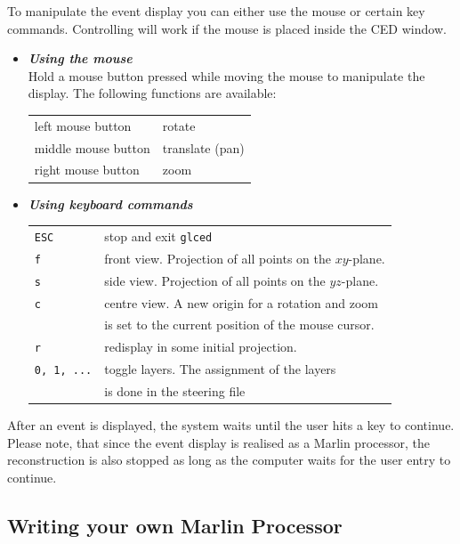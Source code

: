To manipulate the event display you can either use the mouse or 
certain key commands. Controlling will work if the mouse is placed
inside the CED window. 

\begin{itemize}
\item {\em\bf Using the mouse} \\ 
      Hold a mouse button pressed while moving the mouse to 
      manipulate the display. The following functions are available: 

      \begin{center}
      \begin{tabular}{ll}
      left mouse button   & rotate \\
      middle mouse button & translate (pan)\\
      right mouse button  & zoom \\
      \end{tabular}
      \end{center}
\item {\em\bf Using keyboard commands} \\
      \begin{tabular}{ll}
      {\tt ESC} & stop and exit {\tt glced} \\
      {\tt f}   & front view. Projection of all points on the $xy$-plane.\\
      {\tt s}   & side view. Projection of all points on the $yz$-plane. \\
      {\tt c}   & centre view. A new origin for a rotation and zoom \\ 
                & is set to the current position of the mouse cursor.\\
      {\tt r}   & redisplay in some initial projection. \\
      {\tt 0, 1, ...} & toggle layers. The assignment of the layers \\
                      & is done in the steering file \\
      \end{tabular}
\end{itemize}

After an event is displayed, the system waits until the user hits a key
to continue. Please note, that since the event display is realised as a
Marlin processor, the reconstruction is also stopped as long as the computer
waits for the user entry to continue.

\subsection{Writing your own Marlin Processor}


